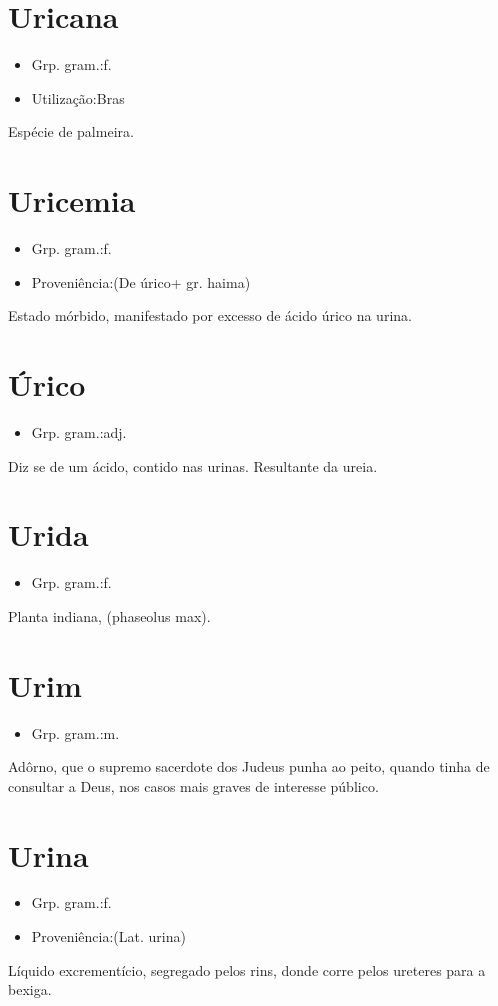 \documentclass{article}
\begin{document}
\section{Uricana}
\begin{itemize}
\item {Grp. gram.:f.}
\end{itemize}
\begin{itemize}
\item {Utilização:Bras}
\end{itemize}
Espécie de palmeira.
\section{Uricemia}
\begin{itemize}
\item {Grp. gram.:f.}
\end{itemize}
\begin{itemize}
\item {Proveniência:(De \textunderscore úrico\textunderscore  + gr. \textunderscore haima\textunderscore )}
\end{itemize}
Estado mórbido, manifestado por excesso de ácido úrico na urina.
\section{Úrico}
\begin{itemize}
\item {Grp. gram.:adj.}
\end{itemize}
Diz se de um ácido, contido nas urinas.
Resultante da ureia.
\section{Urida}
\begin{itemize}
\item {Grp. gram.:f.}
\end{itemize}
Planta indiana, (\textunderscore phaseolus max\textunderscore ).
\section{Urim}
\begin{itemize}
\item {Grp. gram.:m.}
\end{itemize}
Adôrno, que o supremo sacerdote dos Judeus punha ao peito, quando tinha de consultar a Deus, nos casos mais graves de interesse público.
\section{Urina}
\begin{itemize}
\item {Grp. gram.:f.}
\end{itemize}
\begin{itemize}
\item {Proveniência:(Lat. \textunderscore urina\textunderscore )}
\end{itemize}
Líquido excrementício, segregado pelos rins, donde corre pelos ureteres para a bexiga.
\end{document}
